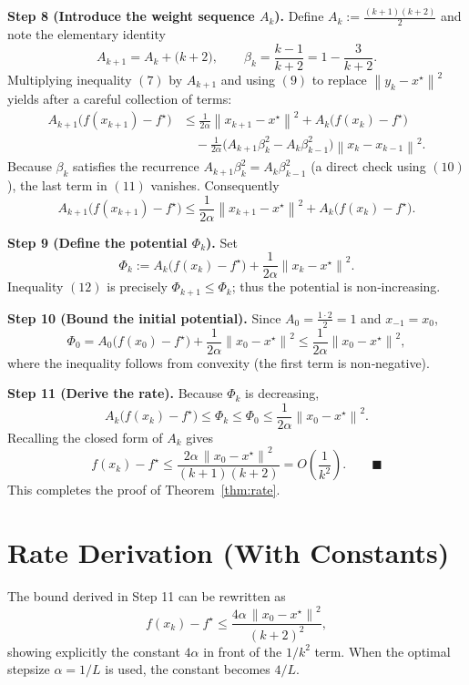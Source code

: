 \documentclass{article}
\newcommand{\norm}[1]{\left\|#1\right\|}
\begin{document}
\bigskip
\noindent\textbf{Step 8 (Introduce the weight sequence \(A_k\)).}
Define \(A_k:=\frac{(k+1)(k+2)}{2}\) and note the elementary identity
\[
A_{k+1}=A_k+\bigl(k+2\bigr),\qquad
\beta_k=\frac{k-1}{k+2}=1-\frac{3}{k+2}.
\tag{10}
\]
Multiplying inequality \((7)\) by \(A_{k+1}\) and using \((9)\) to replace
\(\norm{y_k-x^\star}^2\) yields after a careful collection of terms:
\[
\begin{aligned}
A_{k+1}\!\bigl(f(x_{k+1})-f^\star\bigr)
&\le \frac{1}{2\alpha}\norm{x_{k+1}-x^\star}^2
   +A_k\!\bigl(f(x_k)-f^\star\bigr)\\
&\quad -\frac{1}{2\alpha}\bigl(A_{k+1}\beta_k^2
    -A_k\beta_{k-1}^2\bigr)\norm{x_k-x_{k-1}}^2 .
\end{aligned}
\tag{11}
\]
Because \(\beta_k\) satisfies the recurrence
\(\displaystyle A_{k+1}\beta_k^2 = A_k\beta_{k-1}^2\) (a direct check using
\((10)\)), the last term in \((11)\) vanishes.  Consequently
\[
A_{k+1}\!\bigl(f(x_{k+1})-f^\star\bigr)
\le \frac{1}{2\alpha}\norm{x_{k+1}-x^\star}^2
    +A_k\!\bigl(f(x_k)-f^\star\bigr).
\tag{12}
\]

\bigskip
\noindent\textbf{Step 9 (Define the potential \(\Phi_k\)).}
Set
\[
\Phi_k:=A_k\bigl(f(x_k)-f^\star\bigr)+\frac{1}{2\alpha}\norm{x_k-x^\star}^2 .
\]
Inequality \((12)\) is precisely \(\Phi_{k+1}\le\Phi_k\); thus the
potential is non‑increasing.

\bigskip
\noindent\textbf{Step 10 (Bound the initial potential).}
Since \(A_0=\frac{1\cdot2}{2}=1\) and \(x_{-1}=x_0\),
\[
\Phi_0 = A_0\bigl(f(x_0)-f^\star\bigr)+\frac{1}{2\alpha}\norm{x_0-x^\star}^2
      \le \frac{1}{2\alpha}\norm{x_0-x^\star}^2,
\]
where the inequality follows from convexity (the first term is non‑negative).

\bigskip
\noindent\textbf{Step 11 (Derive the rate).}
Because \(\Phi_k\) is decreasing,
\[
A_k\bigl(f(x_k)-f^\star\bigr)
\le \Phi_k \le \Phi_0 \le \frac{1}{2\alpha}\norm{x_0-x^\star}^2 .
\]
Recalling the closed form of \(A_k\) gives
\[
f(x_k)-f^\star \le
\frac{2\alpha\,\norm{x_0-x^\star}^2}{(k+1)(k+2)}
= O\!\left(\frac{1}{k^{2}}\right).
\qquad\blacksquare
\]
This completes the proof of Theorem~\ref{thm:rate}.

\section*{Rate Derivation (With Constants)}
The bound derived in Step 11 can be rewritten as
\[
f(x_k)-f^\star \le
\frac{4\alpha\,\norm{x_0-x^\star}^2}{(k+2)^2},
\]
showing explicitly the constant \(4\alpha\) in front of the
\(1/k^2\) term.  When the optimal stepsize \(\alpha=1/L\) is used, the
constant becomes \(4/L\).
\end{document}
